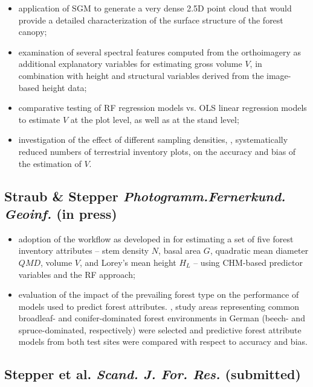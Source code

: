 	\begin{itemize}
		\item application of \ac{SGM} to generate a very dense 2.5D point cloud that would provide a detailed characterization of the surface structure of the forest canopy;
		
		\item examination of several spectral features computed from the orthoimagery as additional explanatory variables
			for estimating gross volume $V$, in combination with height and structural variables derived from the image-based height data;
		
		\item comparative testing of \ac{RF} regression models vs. \ac{OLS} linear regression models to estimate $V$ at the plot level, as well as at the stand level;
		
		\item investigation of the effect of different sampling densities, \ie, systematically reduced numbers of terrestrial inventory plots,
			 on the accuracy and bias of the estimation of $V$.
	\end{itemize}

		
\subsection*{Straub \& Stepper \emph{Photogramm.\:Fernerkund.\: Geoinf.} (in press)}		
		
	\begin{itemize}
		\item adoption of the workflow as developed in \textcite{Stepper.2015b} for estimating a set of five forest inventory attributes -- stem density $N$, 
			basal area $G$, quadratic mean diameter $QMD$, volume $V$, and Lorey’s mean height $H_L$ -- using \ac{CHM}-based predictor variables and the \ac{RF} approach; 
		 
		\item evaluation of the impact of the prevailing forest type on the performance of models used to predict forest attributes.
			\Ie, study areas representing common broadleaf- and conifer-dominated forest environments in German	(beech- and
			spruce-dominated, respectively) were selected and predictive forest attribute models from both test sites were compared with respect to accuracy and bias.
	\end{itemize}


\subsection*{Stepper et al. \emph{Scand. J. For. Res.} (submitted)}		
 
